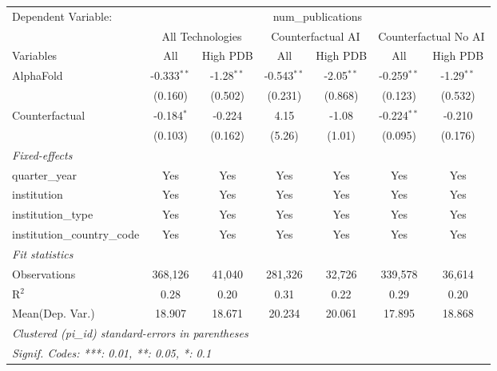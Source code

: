 \begingroup
\centering
\begin{tabular}{lcccccc}
   \tabularnewline \midrule \midrule
   Dependent Variable: & \multicolumn{6}{c}{num\_publications}\\
 & \multicolumn{2}{c}{All Technologies} & \multicolumn{2}{c}{Counterfactual AI} & \multicolumn{2}{c}{Counterfactual No AI} \\
\cmidrule(lr){1-1}\cmidrule(lr){2-3} \cmidrule(lr){4-5} \cmidrule(lr){6-7}
Variables & \multicolumn{1}{c}{All} & \multicolumn{1}{c}{High PDB} & \multicolumn{1}{c}{All} & \multicolumn{1}{c}{High PDB} & \multicolumn{1}{c}{All} & \multicolumn{1}{c}{High PDB} \\
\cmidrule(lr){1-1}\cmidrule(lr){2-2} \cmidrule(lr){3-3} \cmidrule(lr){4-4} \cmidrule(lr){5-5} \cmidrule(lr){6-6} \cmidrule(lr){7-7}
   AlphaFold                    & -0.333$^{**}$ & -1.28$^{**}$ & -0.543$^{**}$ & -2.05$^{**}$ & -0.259$^{**}$ & -1.29$^{**}$\\   
                                & (0.160)       & (0.502)      & (0.231)       & (0.868)      & (0.123)       & (0.532)\\   
   Counterfactual               & -0.184$^{*}$  & -0.224       & 4.15          & -1.08        & -0.224$^{**}$ & -0.210\\   
                                & (0.103)       & (0.162)      & (5.26)        & (1.01)       & (0.095)       & (0.176)\\   
   \midrule
   \emph{Fixed-effects}\\
   quarter\_year                & Yes           & Yes          & Yes           & Yes          & Yes           & Yes\\  
   institution                  & Yes           & Yes          & Yes           & Yes          & Yes           & Yes\\  
   institution\_type            & Yes           & Yes          & Yes           & Yes          & Yes           & Yes\\  
   institution\_country\_code   & Yes           & Yes          & Yes           & Yes          & Yes           & Yes\\  
   \midrule
   \emph{Fit statistics}\\
   Observations                 & 368,126       & 41,040       & 281,326       & 32,726       & 339,578       & 36,614\\  
   R$^2$                        & 0.28          & 0.20         & 0.31          & 0.22         & 0.29          & 0.20\\  
Mean(Dep. Var.) & 18.907 & 18.671 & 20.234 & 20.061 & 17.895 & 18.868 \\
   \midrule \midrule
   \multicolumn{7}{l}{\emph{Clustered (pi\_id) standard-errors in parentheses}}\\
   \multicolumn{7}{l}{\emph{Signif. Codes: ***: 0.01, **: 0.05, *: 0.1}}\\
\end{tabular}
\par\endgroup
